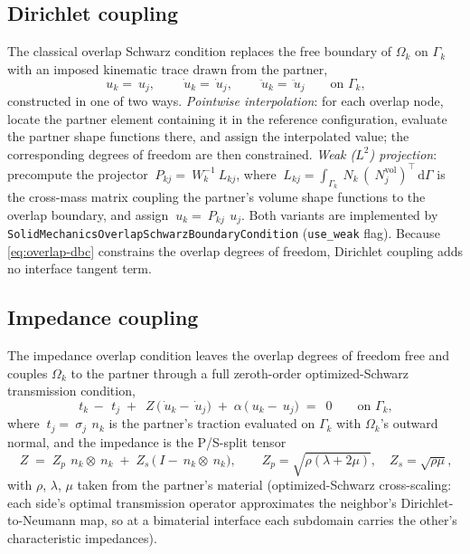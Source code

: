 \documentclass[11pt]{article}
\newcommand{\dd}{\mathrm{d}}
\newcommand{\code}[1]{\texttt{#1}}
\begin{document}
\subsection{Dirichlet coupling}
\label{sec:overlap-dbc}

The classical overlap Schwarz condition replaces the free boundary of
$\Omega_k$ on $\Gamma_k$ with an imposed kinematic trace drawn from the
partner,
\begin{equation}
  ~u_k = ~u_j, \qquad \dot{~u}_k = \dot{~u}_j, \qquad \ddot{~u}_k = \ddot{~u}_j
  \qquad \text{on } \Gamma_k,
  \label{eq:overlap-dbc}
\end{equation}
constructed in one of two ways. \emph{Pointwise interpolation}: for each
overlap node, locate the partner element containing it in the reference
configuration, evaluate the partner shape functions there, and assign the
interpolated value; the corresponding degrees of freedom are then
constrained. \emph{Weak ($L^2$) projection}: precompute the projector
$~P_{kj} = ~W_k^{-1}~L_{kj}$, where
$~L_{kj} = \int_{\Gamma_k} ~N_k\,(~N_j^{\mathrm{vol}})^\top\,\dd\Gamma$ is
the cross-mass matrix coupling the partner's volume shape functions to the
overlap boundary, and assign $~u_k = ~P_{kj}\,~u_j$. Both variants are
implemented by \code{SolidMechanicsOverlapSchwarzBoundaryCondition}
(\code{use\_weak} flag). Because \eqref{eq:overlap-dbc} constrains the
overlap degrees of freedom, Dirichlet coupling adds no interface tangent
term.

\subsection{Impedance coupling}
\label{sec:overlap-imp}

The impedance overlap condition leaves the overlap degrees of freedom free
and couples $\Omega_k$ to the partner through a full zeroth-order
optimized-Schwarz transmission condition,
\begin{equation}
  ~t_k \,-\, ~t_j
  \;+\; ~Z\,\bigl(\dot{~u}_k - \dot{~u}_j\bigr)
  \;+\; \alpha\,\bigl(~u_k - ~u_j\bigr)
  \;=\; ~0
  \qquad \text{on } \Gamma_k,
  \label{eq:imp-overlap}
\end{equation}
where $~t_j = ~\sigma_j\,~n_k$ is the partner's traction evaluated on
$\Gamma_k$ with $\Omega_k$'s outward normal, and the impedance is the
P/S-split tensor
\begin{equation}
  ~Z \;=\; Z_p\, ~n_k \otimes ~n_k
       \;+\; Z_s\, \bigl(~I - ~n_k \otimes ~n_k\bigr),
  \qquad
  Z_p = \sqrt{\rho(\lambda + 2\mu)}, \quad
  Z_s = \sqrt{\rho\mu},
  \label{eq:imp-tensor}
\end{equation}
with $\rho$, $\lambda$, $\mu$ taken from the partner's material
(optimized-Schwarz cross-scaling: each side's optimal transmission operator
approximates the neighbor's Dirichlet-to-Neumann map, so at a bimaterial
interface each subdomain carries the other's characteristic impedances).
\end{document}
